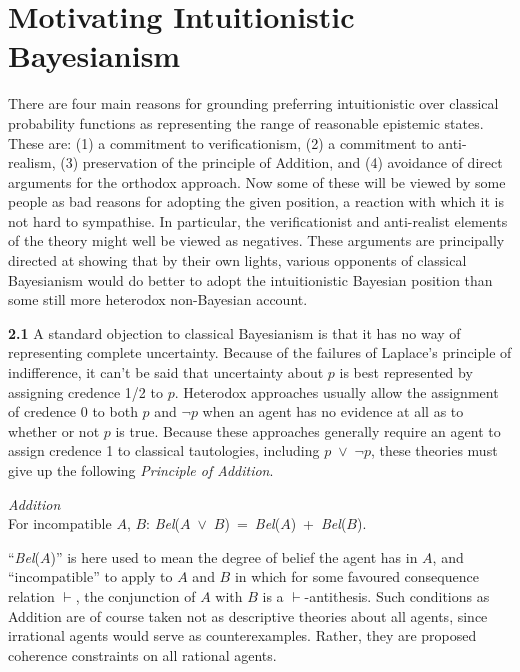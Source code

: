 \documentclass[
  11pt,
  letterpaper,
  DIV=11,
  numbers=noendperiod,
  oneside]{scrartcl}
\begin{document}
\section{Motivating Intuitionistic
Bayesianism}\label{motivating-intuitionistic-bayesianism}

There are four main reasons for grounding preferring intuitionistic over
classical probability functions as representing the range of reasonable
epistemic states. These are: (1) a commitment to verificationism, (2) a
commitment to anti-realism, (3) preservation of the principle of
Addition, and (4) avoidance of direct arguments for the orthodox
approach. Now some of these will be viewed by some people as bad reasons
for adopting the given position, a reaction with which it is not hard to
sympathise. In particular, the verificationist and anti-realist elements
of the theory might well be viewed as negatives. These arguments are
principally directed at showing that by their own lights, various
opponents of classical Bayesianism would do better to adopt the
intuitionistic Bayesian position than some still more heterodox
non-Bayesian account.

\textbf{2.1} A standard objection to classical Bayesianism is that it
has no way of representing complete uncertainty. Because of the failures
of Laplace's principle of indifference, it can't be said that
uncertainty about \(p\) is best represented by assigning credence 1/2 to
\(p\). Heterodox approaches usually allow the assignment of credence 0
to both \(p\) and \({\lnot}\)\(p\) when an agent has no evidence at all
as to whether or not \(p\) is true. Because these approaches generally
require an agent to assign credence 1 to classical tautologies,
including \(p\)~\({\vee}\)~\({\lnot}\)\(p\), these theories must give up
the following \emph{Principle of Addition}.

\emph{Addition}\\
For incompatible \(A\), \(B\):
\emph{Bel}(\(A\)~\({\vee}\)~\(B\))~=~\emph{Bel}(\(A\))~+~\emph{Bel}(\(B\)).

``\emph{Bel}(\(A\))'' is here used to mean the degree of belief the
agent has in \(A\), and ``incompatible'' to apply to \(A\) and \(B\) in
which for some favoured consequence relation \(\vdash\), the conjunction
of \(A\) with \(B\) is a \(\vdash\)-antithesis. Such conditions as
Addition are of course taken not as descriptive theories about all
agents, since irrational agents would serve as counterexamples. Rather,
they are proposed coherence constraints on all rational agents.
\end{document}
